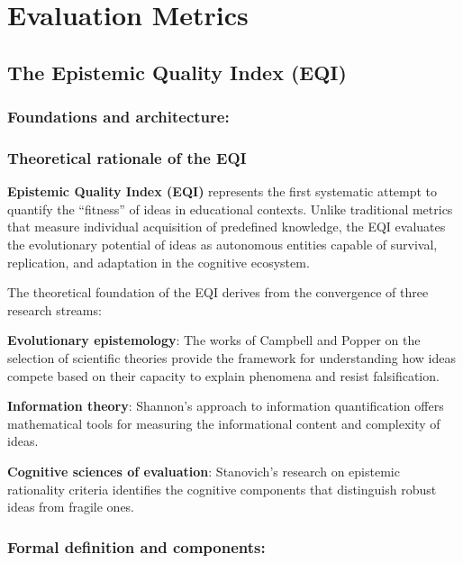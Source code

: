 \chapter{Evaluation Metrics}
\label{evaluation-metrics}

\section{The Epistemic Quality Index (EQI)} \subsection*{Foundations and architecture:}

\subsection{Theoretical rationale of the EQI}

\textbf{Epistemic Quality Index (EQI)} represents the first systematic attempt to quantify the ``fitness'' of ideas in educational contexts. Unlike traditional metrics that measure individual acquisition of predefined knowledge, the EQI evaluates the evolutionary potential of ideas as autonomous entities capable of survival, replication, and adaptation in the cognitive ecosystem.

The theoretical foundation of the EQI derives from the convergence of three research streams:

\textbf{Evolutionary epistemology}: The works of Campbell \cite{Campbell1974} and Popper \cite{Popper1972} on the selection of scientific theories provide the framework for understanding how ideas compete based on their capacity to explain phenomena and resist falsification.

\textbf{Information theory}: Shannon's approach \cite{Shannon1948} to information quantification offers mathematical tools for measuring the informational content and complexity of ideas.

\textbf{Cognitive sciences of evaluation}: Stanovich's research \cite{Stanovich2009} on epistemic rationality criteria identifies the cognitive components that distinguish robust ideas from fragile ones.

\newpage


\subsection{Formal definition and components:}

